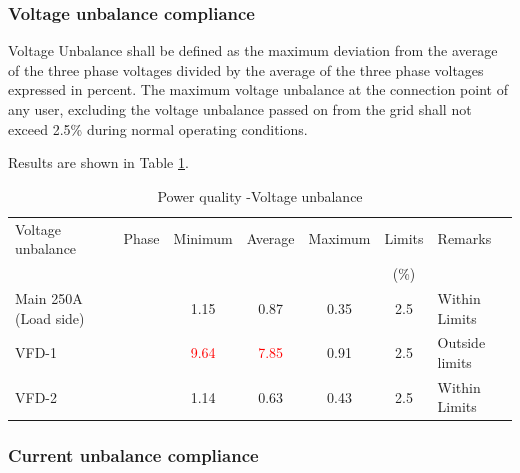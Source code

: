 \subsubsection{Voltage unbalance compliance}

Voltage Unbalance shall be defined as the maximum deviation from the average of the three phase voltages divided by the average of the three phase voltages expressed in 	percent.  The maximum voltage unbalance at the connection point of any user, excluding the voltage unbalance passed on from the grid shall not exceed 2.5\% during normal operating conditions.

Results are shown in Table \ref{tbl_ch04_elecaudit_powerquality_voltageunbalance}.


\begin{table}[!htb]
	\caption{Power quality -Voltage unbalance}
	\label{tbl_ch04_elecaudit_powerquality_voltageunbalance}
	{\scriptsize
		
		\begin{tabular}{l|l|l|l|l|p{2cm}|l}
		\hline
		Voltage unbalance & \multicolumn{1}{c|}{Phase} & \multicolumn{1}{c|}{Minimum} & \multicolumn{1}{c|}{Average} & \multicolumn{1}{c|}{Maximum} & \multicolumn{1}{c|}{Limits} & Remarks \\ 
		& \multicolumn{1}{c|}{} & \multicolumn{1}{c|}{} & \multicolumn{1}{c|}{} & \multicolumn{1}{c|}{} & \multicolumn{1}{c|}{(\%)} &  \\ 
		\hline
		Main 250A (Load side) & \multicolumn{1}{c|}{} & \multicolumn{1}{c|}{1.15} & \multicolumn{1}{c|}{0.87} & \multicolumn{1}{c|}{0.35} & \multicolumn{1}{c|}{2.5} & Within  Limits \\ 
		\hline
		VFD-1 & \multicolumn{1}{c|}{} & \multicolumn{1}{c|}{\textcolor{red}{9.64}} & \multicolumn{1}{c|}{\textcolor{red}{7.85}} & \multicolumn{1}{c|}{0.91} & \multicolumn{1}{c|}{2.5} & Outside limits \\ 
		\hline
		VFD-2 & \multicolumn{1}{c|}{} & \multicolumn{1}{c|}{1.14} & \multicolumn{1}{c|}{0.63} & \multicolumn{1}{c|}{0.43} & \multicolumn{1}{c|}{2.5} & Within  Limits \\ 
		\hline
						
		\end{tabular}
		
	}%
\end{table}




\subsubsection{Current unbalance compliance}

